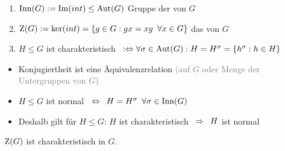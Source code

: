 %
\begin{defin}
	\begin{enumerate}
		\item $\operatorname{Inn}(G) := \operatorname{Im}(int) \leq \operatorname{Aut}(G)$ Gruppe der  von $G$
		\item $\operatorname{Z}(G) := \ker(int) = \{ g \in G : gx = xg \enspace \forall x \in G \}$ das  von $G$
		\item $H \leq G$ ist charakteristisch $\enspace :\Leftrightarrow \forall \sigma \in \operatorname{Aut}(G): H = H^{\sigma} = \{ h^{\sigma} : h \in H \}$
	\end{enumerate}
\end{defin}
%
\begin{bem}
	\begin{itemize}
		\item Konjugiertheit ist eine Äquivalenzrelation \textcolor{gray}{(auf $G$ oder Menge der Untergruppen von $G$)}
		\item $H \leq G$ ist normal $\enspace \Leftrightarrow \enspace H = H^{\sigma} \enspace \forall \sigma \in \operatorname{Inn}(G)$
		\item Deshalb gilt für $H \leq G$: $H$ ist charakteristisch $\enspace \Rightarrow \enspace H$ ist normal
	\end{itemize}
\end{bem}
%
\begin{bsp}
	$\operatorname{Z}(G)$ ist charakteristisch in $G$.
\end{bsp}